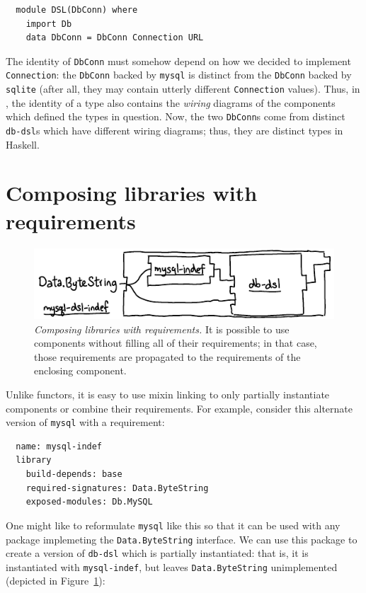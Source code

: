 \begin{verbatim}
  module DSL(DbConn) where
    import Db
    data DbConn = DbConn Connection URL
\end{verbatim}
%
The identity of \verb|DbConn| must somehow depend on how
we decided to implement \verb|Connection|: the \verb|DbConn| backed by
\verb|mysql| is distinct from the \verb|DbConn| backed by \verb|sqlite|
(after all, they may contain utterly different \verb|Connection| values).
Thus, in \Backpack{}, the identity of a type
also contains the \emph{wiring} diagrams of the components which
defined the types in question.  Now, the two \verb|DbConn|s come from
distinct \verb|db-dsl|s which have different wiring diagrams;
thus, they are distinct types in Haskell.

\section{Composing libraries with requirements}

\begin{figure}
\includegraphics{diagrams/composing-requirements.pdf}
\caption{\emph{Composing libraries with requirements.} It is possible
to use components without filling all of their requirements; in that
case, those requirements are propagated to the requirements of the
enclosing component.}
\label{fig:composing-requirements}
\end{figure}

Unlike functors, it is easy to use mixin linking to only partially
instantiate components or combine their requirements.  For example,
consider this alternate version of \verb|mysql| with a requirement:

\begin{verbatim}
  name: mysql-indef
  library
    build-depends: base
    required-signatures: Data.ByteString
    exposed-modules: Db.MySQL
\end{verbatim}
%
One might like to reformulate \verb|mysql| like this so that it can
be used with any package implemeting the \verb|Data.ByteString| interface.
We can use this package to create a version of \verb|db-dsl|
which is partially instantiated: that is, it is instantiated
with \verb|mysql-indef|, but leaves \verb|Data.ByteString|
unimplemented (depicted in Figure~\ref{fig:composing-requirements}):

